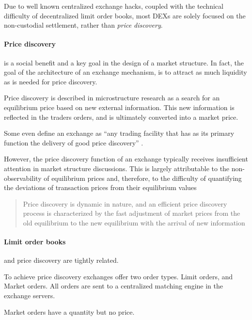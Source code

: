 \documentclass[12pt]{article}
\begin{document}
Due to well known centralized exchange hacks, coupled with the technical difficulty of decentralized limit order books, most DEXs are solely focused on the non-custodial settlement, rather than \emph{price discovery}. 

\paragraph*{Price discovery} is a social benefit and a key goal in the design of a market structure. In fact, the goal of the architecture of an exchange mechanism, is to attract as much liquidity as is needed for price discovery.  \cite{francioni_schwartz_2017}

Price discovery is described in microstructure research as a search for an equilibrium price based on new external information. This new information is reflected in the traders orders, and is ultimately converted into a market price. \citep{RePEc:nbr:nberwo:6257}

Some even define an exchange as ``any trading facility that has as its primary function the delivery of good price discovery'' \cite{francioni_schwartz_2017}. 

However, the price discovery function of an  exchange typically receives insufficient attention in market structure discussions. This is largely attributable to the non-observability of equilibrium prices and, therefore, to the difficulty of quantifying the deviations of transaction prices from their equilibrium values \cite{francioni_schwartz_2017}


\begin{quote}
Price discovery is dynamic in nature, and an efficient price discovery process is characterized by the fast adjustment of market prices from the old equilibrium to the new equilibrium with the arrival of new information \cite{RePEc:udb:wpaper:uwec-2005-01-r}    
\end{quote}

\paragraph*{Limit order books} and price discovery are tightly related. \citep{RePEc:nbr:nberwo:6257} \cite{RePEc:eee:jfinec:v:17:y:1986:i:1:p:5-26}

To achieve price discovery exchanges offer two order types. Limit orders, and Market orders. All orders are sent to a centralized matching engine in the exchange servers. 

Market orders have a quantity but no price. 
\end{document}

